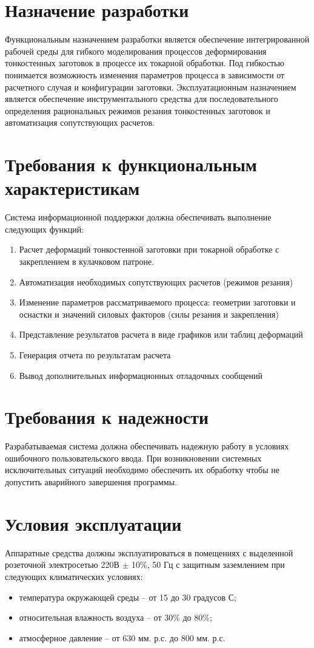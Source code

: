 \documentclass[14pt,oneside,final]{extreport}
\newcommand*\minus{\item[--]} %
\begin{document}
	\section{Назначение разработки}
	Функциональным назначением разработки является обеспечение интегрированной рабочей среды для гибкого моделирования процессов деформирования тонкостенных заготовок в процессе их токарной обработки. Под гибкостью понимается возможность изменения параметров процесса в зависимости от расчетного случая и конфигурации заготовки. Эксплуатационным назначением является обеспечение инструментального средства для последовательного определения рациональных режимов резания тонкостенных заготовок и автоматизация сопутствующих расчетов.
	
	\section{Требования к функциональным характеристикам}
	    Система информационной поддержки должна обеспечивать выполнение следующих функций:
	\begin{enumerate}
	\item Расчет деформаций тонкостенной заготовки при токарной обработке с закреплением в кулачковом патроне.
	\item 	Автоматизация необходимых сопутствующих расчетов (режимов резания)
	\item 	Изменение параметров рассматриваемого процесса: геометрии заготовки  и оснастки и значений силовых факторов (силы резания и закрепления)
	\item 	Представление результатов расчета в виде графиков или таблиц деформаций
	\item 	Генерация отчета по результатам расчета
	\item 	Вывод дополнительных информационных отладочных сообщений 
	\end{enumerate}

	\section{Требования к надежности}
	Разрабатываемая система должна обеспечивать надежную работу в условиях ошибочного пользовательского ввода. При возникновении системных исключительных ситуаций необходимо обеспечить их обработку чтобы не допустить аварийного завершения программы.

	\section{Условия эксплуатации}
	Аппаратные   средства   должны   эксплуатироваться   в помещениях с выделенной розеточной электросетью 220В \(\pm\) 10\%, 50 Гц  с  защитным  заземлением  при  следующих  климатических условиях:
	\begin{itemize}
	\minus температура окружающей среды – от 15 до 30 градусов С;
	\minus относительная влажность воздуха -- от 30\% до 80\%;
	\minus атмосферное давление -- от 630 мм. р.с. до 800 мм. р.с.
	\end{itemize}
\end{document}
